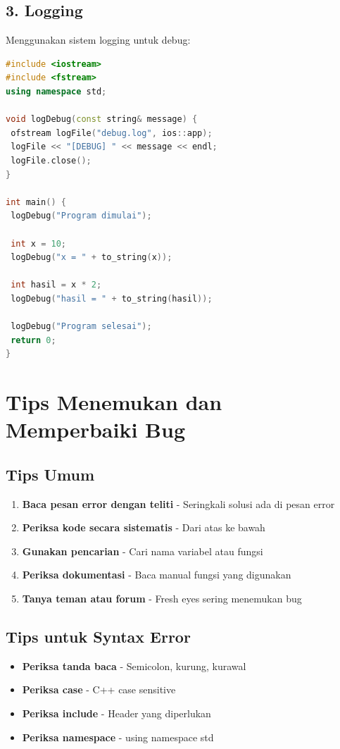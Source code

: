 \subsection{3. Logging}

Menggunakan sistem logging untuk debug:

\begin{lstlisting}[language=c++, caption=Logging Debug]
#include <iostream>
#include <fstream>
using namespace std;

void logDebug(const string& message) {
 ofstream logFile("debug.log", ios::app);
 logFile << "[DEBUG] " << message << endl;
 logFile.close();
}

int main() {
 logDebug("Program dimulai");

 int x = 10;
 logDebug("x = " + to_string(x));

 int hasil = x * 2;
 logDebug("hasil = " + to_string(hasil));

 logDebug("Program selesai");
 return 0;
}
\end{lstlisting}

\section{Tips Menemukan dan Memperbaiki Bug}

\subsection{Tips Umum}

\begin{enumerate}
\item \textbf{Baca pesan error dengan teliti} - Seringkali solusi ada di pesan error
\item \textbf{Periksa kode secara sistematis} - Dari atas ke bawah
\item \textbf{Gunakan pencarian} - Cari nama variabel atau fungsi
\item \textbf{Periksa dokumentasi} - Baca manual fungsi yang digunakan
\item \textbf{Tanya teman atau forum} - Fresh eyes sering menemukan bug
\end{enumerate}

\subsection{Tips untuk Syntax Error}

\begin{itemize}
\item \textbf{Periksa tanda baca} - Semicolon, kurung, kurawal
\item \textbf{Periksa case} - C++ case sensitive
\item \textbf{Periksa include} - Header yang diperlukan
\item \textbf{Periksa namespace} - using namespace std
\end{itemize}

